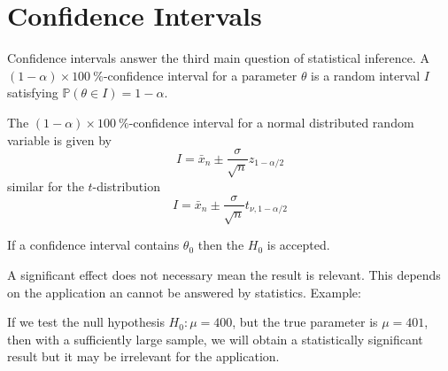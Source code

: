 \section{Confidence Intervals}
Confidence intervals answer the third main question of statistical inference.
A $(1-\alpha)\times 100\:\%$-confidence interval for a parameter $\theta$ is a random interval $I$ satisfying $\mathbb{P}(\theta\in I)=1-\alpha$.

The $(1-\alpha)\times 100\:\%$-confidence interval for a normal distributed random variable is given by
\begin{equation*}
    I=\bar{x}_n \pm \frac{\sigma}{\sqrt{n}}z_{1-\alpha/2}
\end{equation*}
similar for the $t$-distribution
\begin{equation*}
    I=\bar{x}_n \pm \frac{\sigma}{\sqrt{n}}t_{\nu,1-\alpha/2}
\end{equation*}

\newpar{}

If a confidence interval contains $\theta_0$ then the $H_0$ is accepted.

\newpar{}

A significant effect does not necessary mean the result is relevant. This depends on the application an cannot be answered by statistics.
\newpar{}
Example:

If we test the null hypothesis $H_0:\mu=400$, but the true parameter is $\mu=401$, then with a sufficiently large sample, we will obtain a statistically significant result but it may be irrelevant for the application.